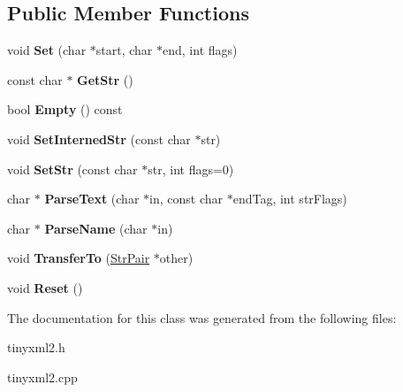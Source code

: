 \subsection*{Public Member Functions}
\begin{DoxyCompactItemize}
\item 
\hypertarget{classtinyxml2_1_1_str_pair_a4f05549373394266a1eecba26813c166}{}void {\bfseries Set} (char $\ast$start, char $\ast$end, int flags)\label{classtinyxml2_1_1_str_pair_a4f05549373394266a1eecba26813c166}

\item 
\hypertarget{classtinyxml2_1_1_str_pair_ad87e3d11330f5e689ba1e7e54c023b57}{}const char $\ast$ {\bfseries Get\+Str} ()\label{classtinyxml2_1_1_str_pair_ad87e3d11330f5e689ba1e7e54c023b57}

\item 
\hypertarget{classtinyxml2_1_1_str_pair_affa1043e73a18f05d5d2faec055725a7}{}bool {\bfseries Empty} () const \label{classtinyxml2_1_1_str_pair_affa1043e73a18f05d5d2faec055725a7}

\item 
\hypertarget{classtinyxml2_1_1_str_pair_a2baf6230e18333e02ab65d0897ee3941}{}void {\bfseries Set\+Interned\+Str} (const char $\ast$str)\label{classtinyxml2_1_1_str_pair_a2baf6230e18333e02ab65d0897ee3941}

\item 
\hypertarget{classtinyxml2_1_1_str_pair_a1f82ec6b5bee35ee7466d8565e43b1de}{}void {\bfseries Set\+Str} (const char $\ast$str, int flags=0)\label{classtinyxml2_1_1_str_pair_a1f82ec6b5bee35ee7466d8565e43b1de}

\item 
\hypertarget{classtinyxml2_1_1_str_pair_ad90521f188e9606a8fbafe5d86fb2246}{}char $\ast$ {\bfseries Parse\+Text} (char $\ast$in, const char $\ast$end\+Tag, int str\+Flags)\label{classtinyxml2_1_1_str_pair_ad90521f188e9606a8fbafe5d86fb2246}

\item 
\hypertarget{classtinyxml2_1_1_str_pair_aa6d8998efceba41d87ec2300c70a6085}{}char $\ast$ {\bfseries Parse\+Name} (char $\ast$in)\label{classtinyxml2_1_1_str_pair_aa6d8998efceba41d87ec2300c70a6085}

\item 
\hypertarget{classtinyxml2_1_1_str_pair_a35f795b1557fe5fdcbd93d3cc5d6b939}{}void {\bfseries Transfer\+To} (\hyperlink{classtinyxml2_1_1_str_pair}{Str\+Pair} $\ast$other)\label{classtinyxml2_1_1_str_pair_a35f795b1557fe5fdcbd93d3cc5d6b939}

\item 
\hypertarget{classtinyxml2_1_1_str_pair_a80c1b3bd99bf62ae85c94a29ce537125}{}void {\bfseries Reset} ()\label{classtinyxml2_1_1_str_pair_a80c1b3bd99bf62ae85c94a29ce537125}

\end{DoxyCompactItemize}


The documentation for this class was generated from the following files\+:\begin{DoxyCompactItemize}
\item 
tinyxml2.\+h\item 
tinyxml2.\+cpp\end{DoxyCompactItemize}
